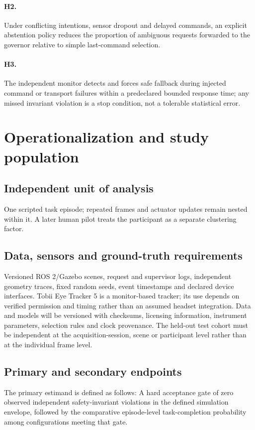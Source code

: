 \documentclass[11pt,a4paper]{article}
\begin{document}
\paragraph{H2.} Under conflicting intentions, sensor dropout and delayed commands, an explicit abstention policy reduces the proportion of ambiguous requests forwarded to the governor relative to simple last-command selection.

\paragraph{H3.} The independent monitor detects and forces safe fallback during injected command or transport failures within a predeclared bounded response time; any missed invariant violation is a stop condition, not a tolerable statistical error.

\section{Operationalization and study population}
\subsection{Independent unit of analysis}
One scripted task episode; repeated frames and actuator updates remain nested within it. A later human pilot treats the participant as a separate clustering factor.

\subsection{Data, sensors and ground-truth requirements}
Versioned ROS 2/Gazebo scenes, request and supervisor logs, independent geometry traces, fixed random seeds, event timestamps and declared device interfaces. Tobii Eye Tracker 5 is a monitor-based tracker; its use depends on verified permission and timing rather than an assumed headset integration. Data and models will be versioned with checksums, licensing information, instrument parameters, selection rules and clock provenance. The held-out test cohort must be independent at the acquisition-session, scene or participant level rather than at the individual frame level.

\subsection{Primary and secondary endpoints}
The primary estimand is defined as follows: A hard acceptance gate of zero observed independent safety-invariant violations in the defined simulation envelope, followed by the comparative episode-level task-completion probability among configurations meeting that gate.
\end{document}
